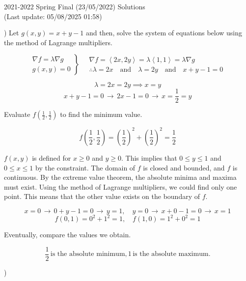 \documentclass{article}
\begin{document}
\newpage

\begin{center}
2021-2022 Spring Final (23/05/2022) Solutions\\
(Last update: 05/08/2025 01:58)
\end{center}

) Let $g(x,y)=x+y-1$ and then, solve the system of equations below using the method of Lagrange multipliers.

\[
\left.
\begin{array}{ll}
\displaystyle\nabla f =\lambda \nabla g \\
\displaystyle g(x,y) = 0
\end{array}
\right\}\quad
\begin{array}{ll}
\nabla f = \left\langle 2x, 2y\right\rangle = \lambda\left\langle1,1\right\rangle = \lambda\nabla g\\\therefore\displaystyle \lambda = 2x\quad \text{and}\quad \lambda = 2y\quad \text{and}\quad x+y-1=0
\end{array}
\]

\[\lambda=2x=2y\implies x=y\]
\[x+y-1=0 \,\rightarrow\, 2x-1 = 0\,\rightarrow\,x=\frac12=y\]

\hfill

\noindent Evaluate $\displaystyle f\left(\frac12,\frac12\right)$ to find the minimum value.

\[f\left(\frac12,\frac12\right)=\left(\frac12\right)^2+\left(\frac12\right)^2=\frac12\]

\hfill

\noindent $f(x,y)$ is defined for $x\geq0$ and $y\geq0$. This implies that $0\leq y \leq1$ and $0\leq x\leq1$ by the constraint. The domain of $f$ is closed and bounded, and $f$ is continuous. By the extreme value theorem, the absolute minima and maxima must exist. Using the method of Lagrange multipliers, we could find only one point. This means that the other value exists on the boundary of $f$.

\[x=0\,\rightarrow\,0+y-1=0\,\rightarrow\,y=1,\quad y=0\,\rightarrow\, x+0-1=0\,\rightarrow\, x=1\]
\[f(0,1) = 0^2 +1^2 = 1,\quad f(1,0) = 1^2+0^2 = 1\]

\hfill

\noindent Eventually, compare the values we obtain.

\[\boxed{\frac12\,\text{is the absolute minimum}, 1\,\text{is the absolute maximum}.}\]

\hfill

)
\end{document}
